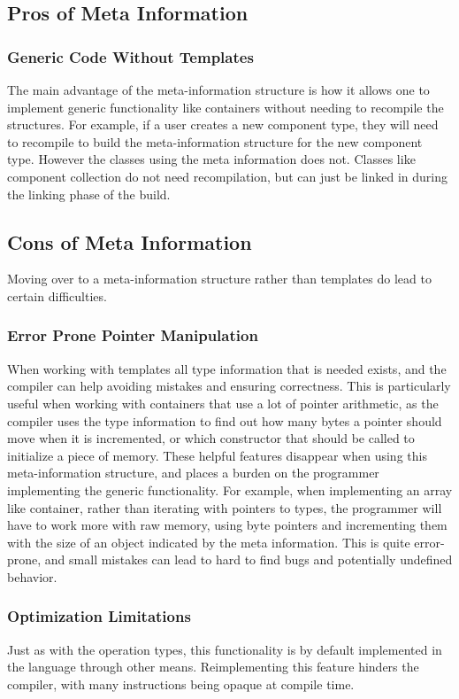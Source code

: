 \subsection{Pros of Meta Information}
\subsubsection{Generic Code Without Templates}
The main advantage of the meta-information structure is how it allows one to implement
generic functionality like containers without needing to recompile the structures.
For example, if a user creates a new component type, they will need to recompile to build the meta-information structure for the new component type.
However the classes using the meta information does not.
Classes like component collection do not need recompilation, but can just be linked in during the linking phase of the build.

\subsection{Cons of Meta Information}
Moving over to a meta-information structure rather than templates do lead to certain difficulties.

\subsubsection{Error Prone Pointer Manipulation}
When working with templates all type information that is needed exists, and the compiler can help avoiding mistakes and ensuring correctness.
This is particularly useful when working with containers that use a lot of pointer arithmetic, as the compiler uses the type information to find out how many bytes a pointer should move when it is incremented, or which constructor that should be called to initialize a piece of memory.
These helpful features disappear when using this meta-information structure, and places a burden on the programmer implementing the generic functionality.
For example, when implementing an array like container, rather than iterating with pointers to types, the programmer will have to work more with raw memory, using byte pointers and incrementing them with the size of an object indicated by the meta information.
This is quite error-prone, and small mistakes can lead to hard to find bugs and potentially undefined behavior.

\subsubsection{Optimization Limitations}
Just as with the operation types, this functionality is by default implemented in the language through other means.
Reimplementing this feature hinders the compiler, with many instructions being opaque at compile time.
